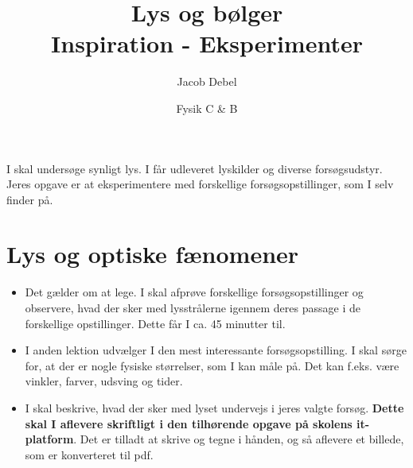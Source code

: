 \documentclass[a4paper, 12pt]{article}
\author{Jacob Debel}
\date{Fysik C \& B}
\title{Lys og bølger\\\medskip
\large Inspiration - Eksperimenter}
\begin{document}
\maketitle
I skal undersøge synligt lys. I får udleveret lyskilder og diverse forsøgsudstyr. Jeres opgave er at eksperimentere med forskellige forsøgsopstillinger, som I selv finder på.

\section*{Lys og optiske fænomener}
\label{sec:org777842c}

\begin{itemize}
\item Det gælder om at lege. I skal afprøve forskellige forsøgsopstillinger og observere, hvad der sker med lysstrålerne igennem deres passage i de forskellige opstillinger. Dette får I ca. 45 minutter til.

\item I anden lektion udvælger I den mest interessante forsøgsopstilling.
I skal sørge for, at der er nogle fysiske størrelser, som I kan måle på. Det kan f.eks. være vinkler, farver, udsving og tider.

\item I skal beskrive, hvad der sker med lyset undervejs i jeres valgte forsøg. \textbf{Dette skal I aflevere skriftligt i den tilhørende opgave på skolens it-platform}. Det er tilladt at skrive og tegne i hånden, og så aflevere et billede, som er konverteret til pdf.
\end{itemize}
\end{document}
